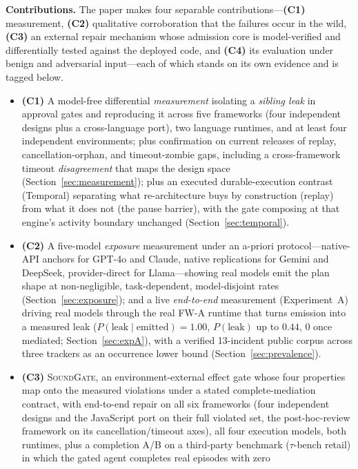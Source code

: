 \documentclass[10pt,journal,compsoc]{IEEEtran}
\newcommand{\sys}{\textsc{SoundGate}}
\begin{document}
\noindent\textbf{Contributions.} The paper makes four separable
contributions---\textbf{(C1)} measurement, \textbf{(C2)} qualitative
corroboration that the failures occur in the wild,
\textbf{(C3)} an external repair mechanism whose admission core is
model-verified and differentially tested against the deployed code, and \textbf{(C4)} its evaluation
under benign and adversarial input---each of which stands on its own
evidence and is tagged below.
\begin{itemize}[leftmargin=1.2em]
\item \textbf{(C1)} A model-free differential \emph{measurement} isolating a
\emph{sibling leak} in approval gates and reproducing it across five frameworks
(four independent designs plus a cross-language port), two language runtimes,
and at least four independent environments; plus confirmation on current
releases of replay, cancellation-orphan, and timeout-zombie gaps, including a
cross-framework timeout \emph{disagreement} that maps the design space
(Section~\ref{sec:measurement}); plus an executed durable-execution contrast
(Temporal) separating what re-architecture buys by construction (replay)
from what it does not (the pause barrier), with the gate composing at that
engine's activity boundary unchanged (Section~\ref{sec:temporal}).
\item \textbf{(C2)} A five-model \emph{exposure} measurement under an a-priori
protocol---native-API anchors for GPT-4o and Claude, native replications for
Gemini and DeepSeek, provider-direct for Llama---showing real models emit the
plan shape at non-negligible, task-dependent, model-disjoint rates
(Section~\ref{sec:exposure}); and a live \emph{end-to-end} measurement
(Experiment~A) driving real models through the real \textsf{FW-A} runtime that
turns emission into a measured leak ($P(\mathrm{leak}\mid\mathrm{emitted}){=}1.00$,
$P(\mathrm{leak})$ up to $0.44$, $0$ once mediated; Section~\ref{sec:expA}),
with a verified 13-incident public corpus across three trackers as an
occurrence lower bound (Section~\ref{sec:prevalence}).
\item \textbf{(C3)} \sys{}, an environment-external effect gate whose four
properties map onto the measured violations under a stated complete-mediation
contract, with end-to-end repair on all six frameworks (four independent
designs and the JavaScript port on their full violated set, the post-hoc-review
framework on its cancellation/timeout axes), all four execution models, both
runtimes, plus a completion A/B on a third-party benchmark ($\tau$-bench
retail) in which the gated agent completes real episodes with zero

\end{itemize}
\end{document}
